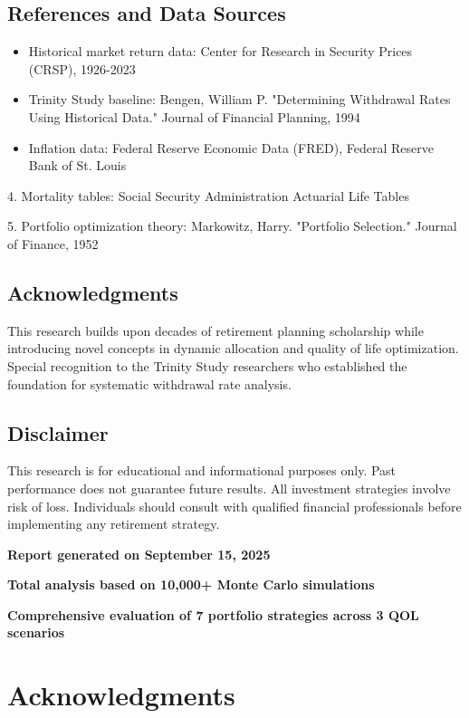 \documentclass[11pt,letterpaper]{article}
\begin{document}
\subsection{References and Data Sources}

\begin{itemize}
\item Historical market return data: Center for Research in Security Prices (CRSP), 1926-2023
\item Trinity Study baseline: Bengen, William P. "Determining Withdrawal Rates Using Historical Data." Journal of Financial Planning, 1994
\item Inflation data: Federal Reserve Economic Data (FRED), Federal Reserve Bank of St. Louis
\end{itemize}
4. Mortality tables: Social Security Administration Actuarial Life Tables

5. Portfolio optimization theory: Markowitz, Harry. "Portfolio Selection." Journal of Finance, 1952


\subsection{Acknowledgments}

This research builds upon decades of retirement planning scholarship while introducing novel concepts in dynamic allocation and quality of life optimization. Special recognition to the Trinity Study researchers who established the foundation for systematic withdrawal rate analysis.


\subsection{Disclaimer}

This research is for educational and informational purposes only. Past performance does not guarantee future results. All investment strategies involve risk of loss. Individuals should consult with qualified financial professionals before implementing any retirement strategy.



\textbf{Report generated on September 15, 2025}

\textbf{Total analysis based on 10,000+ Monte Carlo simulations}

\textbf{Comprehensive evaluation of 7 portfolio strategies across 3 QOL scenarios}



\section*{Acknowledgments}
\end{document}
